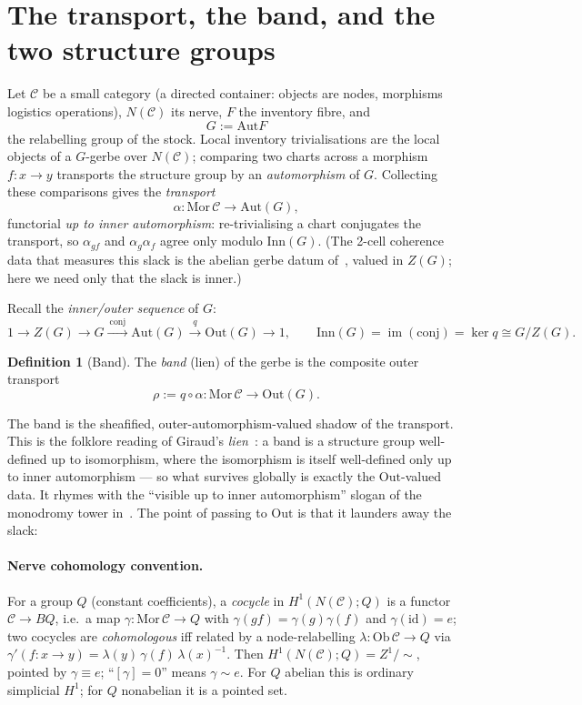 \documentclass[11pt]{article}
\theoremstyle{definition}
\newtheorem{definition}[theorem]{Definition}
\newcommand{\C}{\mathcal{C}}
\newcommand{\Ob}{\mathrm{Ob}}
\newcommand{\Mor}{\mathrm{Mor}}
\newcommand{\id}{\mathrm{id}}
\newcommand{\Aut}{\mathrm{Aut}}
\newcommand{\Inn}{\mathrm{Inn}}
\newcommand{\Out}{\mathrm{Out}}
\begin{document}
\section{The transport, the band, and the two structure groups}\label{sec:prelim}

Let $\C$ be a small category (a directed container: objects are nodes, morphisms logistics
operations), $N(\C)$ its nerve, $F$ the inventory fibre, and
\[
G:=\Aut F
\]
the relabelling group of the stock. Local inventory trivialisations are the local objects of a
$G$-gerbe over $N(\C)$; comparing two charts across a morphism $f:x\to y$ transports the structure
group by an \emph{automorphism} of $G$. Collecting these comparisons gives the \emph{transport}
\[
\alpha:\Mor\,\C\longrightarrow\Aut(G),
\]
functorial \emph{up to inner automorphism}: re-trivialising a chart conjugates the transport, so
$\alpha_{gf}$ and $\alpha_g\alpha_f$ agree only modulo $\Inn(G)$. (The 2-cell coherence data that
measures this slack is the abelian gerbe datum of~\cite{gerbenote}, valued in $Z(G)$; here we need
only that the slack is inner.)

Recall the \emph{inner/outer sequence} of $G$:
\begin{equation}\label{eq:star}
1\longrightarrow Z(G)\longrightarrow G\xrightarrow{\ \mathrm{conj}\ }\Aut(G)
\xrightarrow{\ q\ }\Out(G)\longrightarrow 1,
\qquad \Inn(G)=\operatorname{im}(\mathrm{conj})=\ker q\cong G/Z(G).
\end{equation}

\begin{definition}[Band]\label{def:band}
The \emph{band} (lien) of the gerbe is the composite outer transport
\[
\rho:=q\circ\alpha:\Mor\,\C\longrightarrow\Out(G).
\]
\end{definition}

The band is the sheafified, outer-automorphism-valued shadow of the transport. This is the folklore
reading of Giraud's \emph{lien}~\cite{giraud}: a band is a structure group well-defined up to
isomorphism, where the isomorphism is itself well-defined only up to inner automorphism --- so what
survives globally is exactly the $\Out$-valued data. It rhymes with the ``visible up to inner
automorphism'' slogan of the monodromy tower in~\cite{h1note}. The point of passing to $\Out$ is that
it launders away the slack:

\paragraph{Nerve cohomology convention.} For a group $Q$ (constant coefficients), a \emph{cocycle} in
$H^1(N(\C);Q)$ is a functor $\C\to BQ$, i.e.\ a map $\gamma:\Mor\,\C\to Q$ with $\gamma(gf)=\gamma(g)\gamma(f)$
and $\gamma(\id)=e$; two cocycles are \emph{cohomologous} iff related by a node-relabelling
$\lambda:\Ob\,\C\to Q$ via $\gamma'(f\colon x\to y)=\lambda(y)\,\gamma(f)\,\lambda(x)^{-1}$. Then
$H^1(N(\C);Q)=Z^1/{\sim}$, pointed by $\gamma\equiv e$; ``$[\gamma]=0$'' means $\gamma\sim e$. For $Q$
abelian this is ordinary simplicial $H^1$; for $Q$ nonabelian it is a pointed set.
\end{document}
